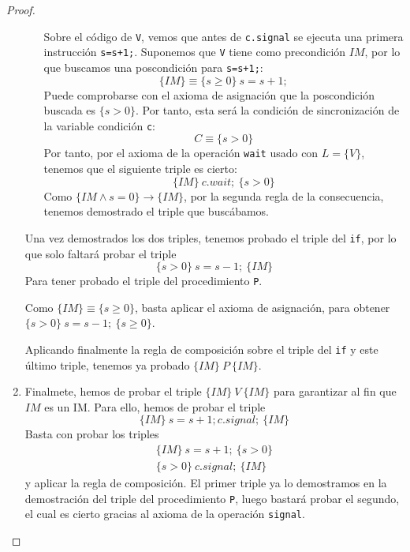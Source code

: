 \begin{ejemplo}
\begin{proof}
\begin{enumerate}
\begin{enumerate}
                        Sobre el código de \verb|V|, vemos que antes de \verb|c.signal| se ejecuta una primera instrucción \verb|s=s+1;|. Suponemos que \verb|V| tiene como precondición $IM$, por lo que buscamos una poscondición para \verb|s=s+1;|:
                        \begin{equation*}
                            \{IM\}\equiv \{s\geq 0\}\ s=s+1;
                        \end{equation*}
                        Puede comprobarse con el axioma de asignación que la poscondición buscada es $\{s>0\}$. Por tanto, esta será la condición de sincronización de la variable condición \verb|c|:
                        \begin{equation*}
                            C \equiv \{s>0\}
                        \end{equation*}
                        Por tanto, por el axioma de la operación \verb|wait| usado con $L=\{V\}$, tenemos que el siguiente triple es cierto:
                        \begin{equation*}
                            \{IM\}\ c.wait;\ \{s>0\}
                        \end{equation*}
                        Como $\{IM \land s=0\}\to \{IM\}$, por la segunda regla de la consecuencia, tenemos demostrado el triple que buscábamos.
                \end{enumerate}
                Una vez demostrados los dos triples, tenemos probado el triple del \verb|if|, por lo que solo faltará probar el triple 
                \begin{equation*}
                    \{s>0\}\ s=s-1;\ \{IM\}
                \end{equation*}
                Para tener probado el triple del procedimiento \verb|P|.

                Como $\{IM\} \equiv \{s\geq 0\}$, basta aplicar el axioma de asignación, para obtener $\{s>0\}\ s=s-1;\ \{s\geq 0\}$.

                Aplicando finalmente la regla de composición sobre el triple del \verb|if| y este último triple, tenemos ya probado $\{IM\}\ P\ \{IM\}$.

            \item Finalmete, hemos de probar el triple $\{IM\}\ V\ \{IM\}$ para garantizar al fin que $IM$ es un IM\@. Para ello, hemos de probar el triple
                \begin{equation*}
                    \{IM\}\ s=s+1; c.signal;\ \{IM\}
                \end{equation*}
                Basta con probar los triples
                \begin{gather*}
                    \{IM\}\ s=s+1;\ \{s>0\} \\
                    \{s>0\}\ c.signal;\ \{IM\}
                \end{gather*}
                y aplicar la regla de composición. El primer triple ya lo demostramos en la demostración del triple del procedimiento \verb|P|, luego bastará probar el segundo, el cual es cierto gracias al axioma de la operación \verb|signal|.


\end{enumerate}
\end{proof}
\end{ejemplo}
